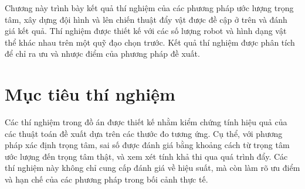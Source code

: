 Chương này trình bày kết quả thí nghiệm của các phương pháp ước lượng trọng tâm, xây dựng đội hình và lên chiến thuật đẩy vật được đề cập ở trên và đánh giá kết quả. Thí nghiệm được thiết kế với các số lượng robot và hình dạng vật thể khác nhau trên một quỹ đạo chọn trước. Kết quả thí nghiệm được phân tích để chỉ ra ưu và nhược điểm của phương pháp đề xuất.

\section{Mục tiêu thí nghiệm}
Các thí nghiệm trong đồ án được thiết kế nhằm kiểm chứng tính hiệu quả của các thuật toán đề xuất dựa trên các thước đo tương ứng. Cụ thể, với phương pháp xác định trọng tâm, sai số được đánh giá bằng khoảng cách từ trọng tâm ước lượng đến trọng tâm thật, và xem xét tính khả thi qua quá trình đẩy. Các thí nghiệm này không chỉ cung cấp đánh giá về hiệu suất, mà còn làm rõ ưu điểm và hạn chế của các phương pháp trong bối cảnh thực tế.